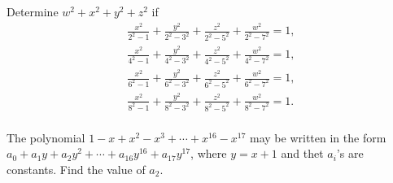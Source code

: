 \begin{question}[name={1984 AIME, \href{https://artofproblemsolving.com/community/c6h66517p392635}{Problem 15}}]
	Determine $w^2+x^2+y^2+z^2$ if
	\[ \begin{array}{l} \displaystyle \frac{x^2}{2^2-1}+\frac{y^2}{2^2-3^2}+\frac{z^2}{2^2-5^2}+\frac{w^2}{2^2-7^2}=1, \\ \displaystyle \frac{x^2}{4^2-1}+\frac{y^2}{4^2-3^2}+\frac{z^2}{4^2-5^2}+\frac{w^2}{4^2-7^2}=1, \\ \displaystyle \frac{x^2}{6^2-1}+\frac{y^2}{6^2-3^2}+\frac{z^2}{6^2-5^2}+\frac{w^2}{6^2-7^2}=1, \\ \displaystyle \frac{x^2}{8^2-1}+\frac{y^2}{8^2-3^2}+\frac{z^2}{8^2-5^2}+\frac{w^2}{8^2-7^2}=1. \\ \end{array}  \]
\end{question}
%
%
%	
%	
%	
%	

% 

\begin{question}[name={1986 AIME, \href{https://artofproblemsolving.com/community/c4p394407}{Problem 11}}]
	The polynomial $1-x+x^2-x^3+\cdots+x^{16}-x^{17}$ may be written in the form $a_0+a_1y+a_2y^2+\cdots +a_{16}y^{16}+a_{17}y^{17}$, where $y=x+1$ and thet $a_i$'s are constants. Find the value of $a_2$.	
\end{question}

%





